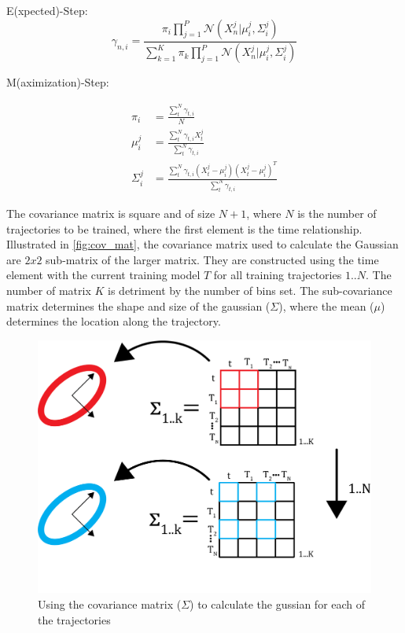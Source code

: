 E(xpected)-Step:
\begin{equation}
    \gamma_{n,i} = \frac{\pi_i \prod_{j=1}^{P} \mathcal{N}( X_n^j | \mu_i^j, \Sigma_i^j)  }{   \sum_{k=1}^{K} \pi_k \prod_{j=1}^{P} \mathcal{N}( X_n^j | \mu_i^j, \Sigma_i^j)}
    \label{eq:EstepTPGMM}
\end{equation}

 M(aximization)-Step:
 
\begin{equation} 
\begin{aligned} 
    \pi_i &= \frac{\sum_t^N \gamma_{t,i}}{N} \\ 
    \mu_i^j &= \frac{\sum_t^N \gamma_{t,i} X_t^j}{\sum_t^N \gamma_{t,i}} \\ 
    \Sigma_i^j &= \frac{\sum_t^N \gamma_{t,i} ( X_t^j - \mu_i^j)  ( X_t^j - \mu_i^j)^T   }{\sum_t^N \gamma_{t,i}}  
\end{aligned} 
\label{eq:MstepTPGMM} 
\end{equation} 


The covariance matrix is square and of size $N+1$, where $N$ is the number of trajectories to be trained, where the first element is the time relationship. Illustrated in \autoref{fig:cov_mat}, the covariance matrix used to calculate the Gaussian are $2x2$ sub-matrix of the larger matrix. They are constructed using the time element with the current training model $T$ for all training trajectories $1..N$. The number of matrix $K$ is detriment by the number of bins set. The sub-covariance matrix determines the shape and size of the gaussian ($\Sigma$), where the mean  ($\mu$) determines the location along the trajectory. 


\begin{figure}
    \centering
    \includegraphics{images/background/cov_matrix.png}
    \caption[Covariance Matrix Illustration]{Using the covariance matrix ($\Sigma$) to calculate the gussian for each of the trajectories}
    \label{fig:cov_mat}
\end{figure}



